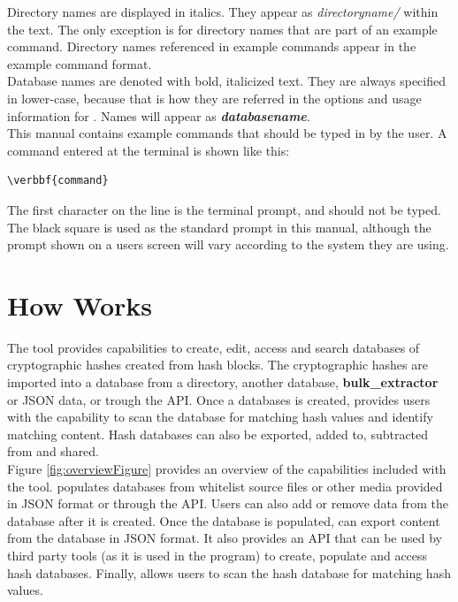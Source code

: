 \documentclass[11pt,fleqn]{article} %
\begin{document}
Directory names are displayed in italics. They appear as \textit{directoryname/} within the text. The only exception is for directory names that are part of an example command. Directory names referenced in example commands appear in the example command format.\\

Database names are denoted with bold, italicized text. They are always specified in lower-case, because that is how they are referred in the options and usage information for \hdb. Names will appear as \textbf{\textit{databasename}}.\\

This manual contains example commands that should be typed in by the user. A command entered at the terminal is shown like this: \begin{Verbatim}[commandchars=\\\{\}]
\verbbf{command}
\end{Verbatim}

The first character on the line is the terminal prompt, and should not be typed. The black square is used as the standard prompt in this manual, although the prompt shown on a users screen will vary according to the system they are using.\\


\section{How \hdb Works}
The \hdb tool provides capabilities to create, edit, access and search databases of cryptographic hashes created from hash blocks. The cryptographic hashes are imported into a database from a directory, another database, \textbf{bulk\_extractor} or JSON data, or trough the \hdb API.
Once a databases is created, \hdb provides users with the capability to scan the database for matching hash values and identify matching content. Hash databases can also be exported, added to, subtracted from and shared.\\


Figure \ref{fig:overviewFigure} provides an overview of the capabilities included with the \hdb tool. \hdb populates databases from whitelist source files
or other media provided in JSON format or through the API.
Users can also add or remove data from the database after it is created.
Once the database is populated, \hdb can export content from the database in JSON format. It also provides an API that can be used by third party tools (as it is used in the \bulk program) to create, populate and access hash databases. Finally, \hdb allows users to scan the hash database for matching hash values.\\
\end{document}
